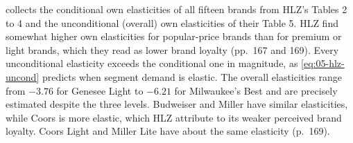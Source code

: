  collects the conditional own elasticities of all fifteen brands from HLZ's Tables 2 to 4 and
the unconditional (overall) own elasticities of their Table 5. HLZ find somewhat higher own elasticities for
popular-price brands than for premium or light brands, which they read as lower brand loyalty (pp.~167 and 169). Every unconditional
elasticity exceeds the conditional one in magnitude, as \eqref{eq:05-hlz-uncond} predicts when segment demand is
elastic. The overall elasticities range from $-3.76$ for Genesee Light to $-6.21$ for Milwaukee's Best and are
precisely estimated despite the three levels. Budweiser and Miller have similar elasticities, while Coors is more
elastic, which HLZ attribute to its weaker perceived brand loyalty. Coors Light and Miller Lite have about the same
elasticity (p.~169).

